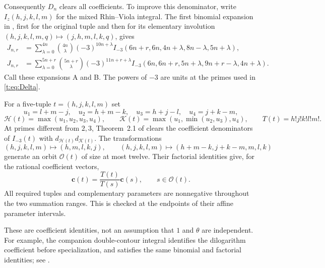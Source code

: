 \documentclass[11pt]{amsart}
\theoremstyle{plain}
\theoremstyle{remark}\newtheorem{remark}[theorem]{Remark}
\numberwithin{equation}{section}
\begin{document}
Consequently $D_n$ clears all coefficients. To improve this denominator,
write $I_z(h,j,k,l,m)$ for the mixed Rhin--Viola integral. The first binomial
expansion in \cite[Lemma 2.1]{VZ18}, first for the original tuple and then
for its elementary involution $(h,j,k,l,m,q)\mapsto(j,h,m,l,k,q)$, gives
\begin{align}
 J_{n,r}&=\sum_{\lambda=0}^{4n}\binom{4n}{\lambda}(-3)^{10n+\lambda}
 I_{-3}(6n+r,6n,4n+\lambda,8n-\lambda,5n+\lambda),\label{t:eq:A}\\
 J_{n,r}&=\sum_{\lambda=0}^{5n+r}\binom{5n+r}{\lambda}(-3)^{11n+r+\lambda}
 I_{-3}(6n,6n+r,5n+\lambda,9n+r-\lambda,4n+\lambda).\label{t:eq:B}
\end{align}
Call these expansions A and B. The powers of $-3$ are units at the primes
used in \eqref{t:eq:Delta}.

For a five-tuple $t=(h,j,k,l,m)$ set
\[
 u_1=l+m-j,\quad u_2=h+m-k,\quad u_3=h+j-l,\quad u_4=j+k-m,
\]
\[
 \mathcal H(t)=\max(u_1,u_2,u_3,u_4),\qquad
 \mathcal K(t)=\max(u_1,\min(u_2,u_3),u_4),\qquad
 T(t)=h!j!k!l!m!.
\]
At primes different from $2,3$, Theorem~2.1 of \cite{RV05} clears the
coefficient denominators of $I_{-3}(t)$ with
$d_{\mathcal H(t)}d_{\mathcal K(t)}$. The transformations
\[
 (h,j,k,l,m)\mapsto(h,m,l,k,j),\qquad
 (h,j,k,l,m)\mapsto(h+m-k,j+k-m,m,l,k)
\]
generate an orbit $\mathcal O(t)$ of size at most twelve. Their factorial
identities give, for the rational coefficient vectors,
\begin{equation}\label{t:eq:factorial}
 \boldsymbol c(t)=\frac{T(t)}{T(s)}\boldsymbol c(s),\qquad s\in\mathcal O(t).
\end{equation}
All required tuples and complementary parameters are nonnegative throughout
the two summation ranges. This is checked at the endpoints of their affine
parameter intervals.

These are coefficient identities, not an assumption that $1$ and $\theta$
are independent. For example, the companion double-contour integral
identifies the dilogarithm coefficient before specialization, and satisfies
the same binomial and factorial identities; see \cite[(2.3)]{VZ18}.
\end{document}
